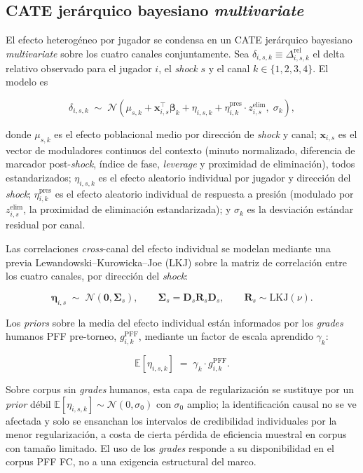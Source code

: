 \subsection{CATE jerárquico bayesiano \textit{multivariate}}

El efecto heterogéneo por jugador se condensa en un CATE jerárquico
bayesiano \textit{multivariate} sobre los cuatro canales conjuntamente.
Sea $\delta_{i,s,k} \equiv \Delta^{\text{rel}}_{i,s,k}$ el delta
relativo observado para el jugador $i$, el \textit{shock} $s$ y el
canal $k \in \{1, 2, 3, 4\}$. El modelo es

\[
\delta_{i,s,k} \;\sim\; \mathcal{N}\left( \mu_{s,k} + \mathbf{x}_{i,s}^{\top} \boldsymbol{\beta}_k + \eta_{i,s,k} + \eta_{i,k}^{\text{pres}} \cdot z_{i,s}^{\text{elim}},\; \sigma_k \right),
\]

donde $\mu_{s,k}$ es el efecto poblacional medio por dirección de
\textit{shock} y canal; $\mathbf{x}_{i,s}$ es el vector de moduladores
continuos del contexto (minuto normalizado, diferencia de marcador
post-\textit{shock}, índice de fase, \textit{leverage} y proximidad
de eliminación), todos estandarizados; $\eta_{i,s,k}$ es el efecto
aleatorio individual por jugador y dirección del \textit{shock};
$\eta_{i,k}^{\text{pres}}$ es el efecto aleatorio individual de
respuesta a presión (modulado por $z_{i,s}^{\text{elim}}$, la
proximidad de eliminación estandarizada); y $\sigma_k$ es la
desviación estándar residual por canal.

Las correlaciones \textit{cross}-canal del efecto individual se
modelan mediante una previa Lewandowski--Kurowicka--Joe (LKJ) sobre
la matriz de correlación entre los cuatro canales, por dirección del
\textit{shock}:

\[
\boldsymbol{\eta}_{i,s} \;\sim\; \mathcal{N}(\boldsymbol{0}, \boldsymbol{\Sigma}_s),
\qquad
\boldsymbol{\Sigma}_s = \mathbf{D}_s \mathbf{R}_s \mathbf{D}_s,
\qquad
\mathbf{R}_s \sim \text{LKJ}(\nu).
\]

Los \textit{priors} sobre la media del efecto individual están
informados por los \textit{grades} humanos PFF pre-torneo,
$g^{\text{PFF}}_{i,k}$, mediante un factor de escala aprendido
$\gamma_k$:

\[
\mathbb{E}[\eta_{i,s,k}] \;=\; \gamma_k \cdot g^{\text{PFF}}_{i,k}.
\]

Sobre corpus sin \textit{grades} humanos, esta capa de regularización
se sustituye por un \textit{prior} débil
$\mathbb{E}[\eta_{i,s,k}] \sim \mathcal{N}(0, \sigma_0)$ con $\sigma_0$
amplio; la identificación causal no se ve afectada y solo se
ensanchan los intervalos de credibilidad individuales por la menor
regularización, a costa de cierta pérdida de eficiencia muestral en
corpus con tamaño limitado. El uso de los \textit{grades} responde a su
disponibilidad en el corpus PFF FC, no a una exigencia estructural
del marco.

